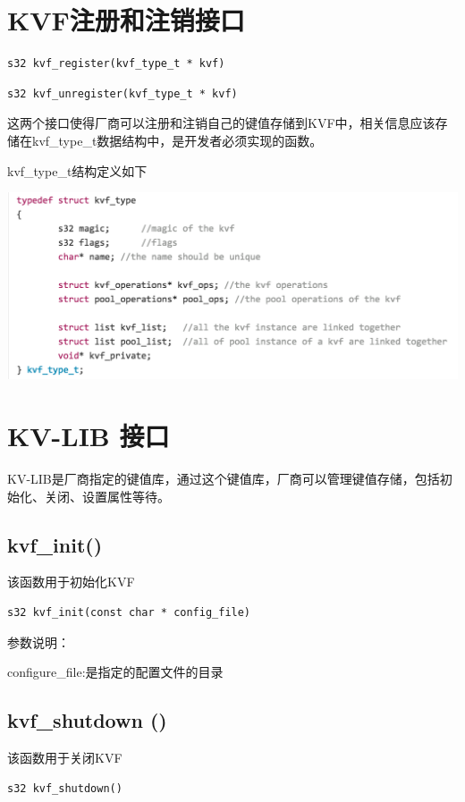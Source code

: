\section{KVF注册和注销接口}
	\begin{Verbatim}[frame = none]
    s32 kvf_register(kvf_type_t * kvf)
	\end{Verbatim}
	\begin{Verbatim}[frame = none]
    s32 kvf_unregister(kvf_type_t * kvf)
	\end{Verbatim}
		

	这两个接口使得厂商可以注册和注销自己的键值存储到KVF中，相关信息应该存储在kvf\_type\_t数据结构中，是开发者必须实现的函数。

	kvf\_type\_t结构定义如下

	\begin{center}
		\includegraphics[width=13.9cm]{img/figure6.pdf}
	\end{center}
\section{KV-LIB 接口}
	KV-LIB是厂商指定的键值库，通过这个键值库，厂商可以管理键值存储，包括初始化、关闭、设置属性等待。
	\subsection{kvf\_init()}
		该函数用于初始化KVF
		\begin{Verbatim}[frame = none]
    s32 kvf_init(const char * config_file)
		\end{Verbatim}

		参数说明：
			
			configure\_file:是指定的配置文件的目录
	\subsection{kvf\_shutdown ()}
		该函数用于关闭KVF
			
		\begin{Verbatim}[frame = none]
    s32 kvf_shutdown()
		\end{Verbatim}

